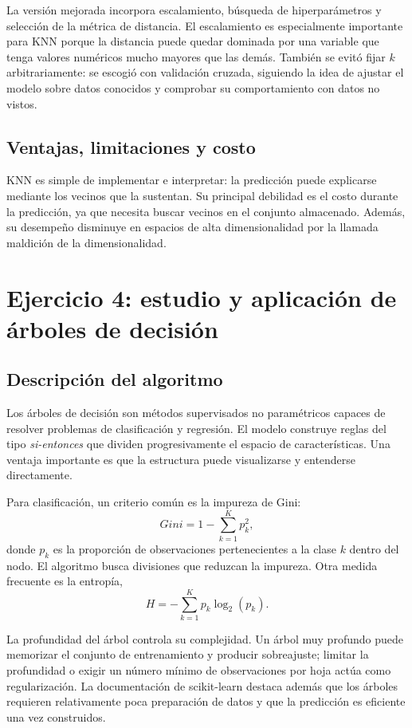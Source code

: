 \documentclass[14pt,twoside]{article}
\begin{document}
La versión mejorada incorpora escalamiento, búsqueda de hiperparámetros y selección de la métrica de distancia. El escalamiento es especialmente importante para KNN porque la distancia puede quedar dominada por una variable que tenga valores numéricos mucho mayores que las demás. También se evitó fijar $k$ arbitrariamente: se escogió con validación cruzada, siguiendo la idea de ajustar el modelo sobre datos conocidos y comprobar su comportamiento con datos no vistos. \cite{martinez2026,sklearnNeighbors}

\subsection{Ventajas, limitaciones y costo}

KNN es simple de implementar e interpretar: la predicción puede explicarse mediante los vecinos que la sustentan. Su principal debilidad es el costo durante la predicción, ya que necesita buscar vecinos en el conjunto almacenado. Además, su desempeño disminuye en espacios de alta dimensionalidad por la llamada maldición de la dimensionalidad. \cite{sklearnNeighbors}

\section{Ejercicio 4: estudio y aplicación de árboles de decisión}

\subsection{Descripción del algoritmo}

Los árboles de decisión son métodos supervisados no paramétricos capaces de resolver problemas de clasificación y regresión. El modelo construye reglas del tipo \textit{si-entonces} que dividen progresivamente el espacio de características. Una ventaja importante es que la estructura puede visualizarse y entenderse directamente. \cite{sklearnTree}

Para clasificación, un criterio común es la impureza de Gini:
\[
Gini=1-\sum_{k=1}^{K}p_k^2,
\]
donde $p_k$ es la proporción de observaciones pertenecientes a la clase $k$ dentro del nodo. El algoritmo busca divisiones que reduzcan la impureza. Otra medida frecuente es la entropía,
\[
H=-\sum_{k=1}^{K}p_k\log_2(p_k).
\]

La profundidad del árbol controla su complejidad. Un árbol muy profundo puede memorizar el conjunto de entrenamiento y producir sobreajuste; limitar la profundidad o exigir un número mínimo de observaciones por hoja actúa como regularización. La documentación de scikit-learn destaca además que los árboles requieren relativamente poca preparación de datos y que la predicción es eficiente una vez construidos. \cite{sklearnTree}
\end{document}
